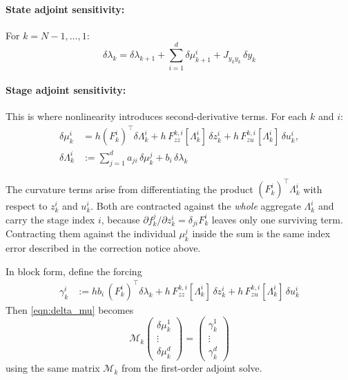 \documentclass[11pt]{article}
\newcommand{\tp}{^\top}
\begin{document}
\paragraph{State adjoint sensitivity:} For $k = N-1,\ldots,1$:
\begin{equation}
\label{eqn:delta_lambda}
\boxed{
\delta\lambda_k = \delta\lambda_{k+1} + \sum_{i=1}^d \delta\mu_{k+1}^i + J_{y_k y_k}\, \delta y_k
}
\end{equation}

\paragraph{Stage adjoint sensitivity:} This is where nonlinearity introduces second-derivative terms. For each $k$ and $i$:
\begin{equation}
\label{eqn:delta_mu}
\boxed{
\begin{aligned}
\delta\mu_k^i &= h (F_k^i)\tp \delta\Lambda_k^i
   + h\, F_{zz}^{k,i}[\Lambda_k^i]\, \delta z_k^i
   + h\, F_{zu}^{k,i}[\Lambda_k^i]\, \delta u_k^i, \\[4pt]
\delta\Lambda_k^i &:= \sum_{j=1}^d a_{ji}\,\delta\mu_k^j + b_i\,\delta\lambda_k
\end{aligned}
}
\end{equation}

The curvature terms arise from differentiating the product $(F_k^i)\tp \Lambda_k^i$
with respect to $z_k^i$ and $u_k^i$. Both are contracted against the
\emph{whole} aggregate $\Lambda_k^i$ and carry the stage index $i$, because
$\partial f_k^j/\partial z_k^i = \delta_{ji} F_k^i$ leaves only one surviving
term. Contracting them against the individual $\mu_k^j$ inside the sum is the
same index error described in the correction notice above.

In block form, define the forcing
\begin{equation}
\begin{aligned}
\gamma_k^i &:= h b_i\, (F_k^i)\tp \delta\lambda_k
   + h\, F_{zz}^{k,i}[\Lambda_k^i]\, \delta z_k^i
   + h\, F_{zu}^{k,i}[\Lambda_k^i]\, \delta u_k^i
\end{aligned}
\end{equation}
Then \eqref{eqn:delta_mu} becomes
\begin{equation}
\mathcal{M}_k \begin{pmatrix} \delta\mu_k^1 \\ \vdots \\ \delta\mu_k^d \end{pmatrix} = \begin{pmatrix} \gamma_k^1 \\ \vdots \\ \gamma_k^d \end{pmatrix}
\end{equation}
using the same matrix $\mathcal{M}_k$ from the first-order adjoint solve.
\end{document}
